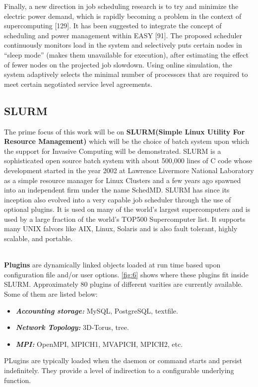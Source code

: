 Finally, a new direction in job scheduling research is to try and minimize the electric power demand, which is rapidly becoming a problem in the context of supercomputing [129]. It has been suggested to integrate the concept of scheduling and power management within EASY [91]. The proposed scheduler continuously monitors load in the system and selectively puts certain nodes in “sleep mode” (makes them unavailable for execution), after estimating the effect of fewer nodes on the projected job slowdown. Using online simulation, the system adaptively selects the minimal number of processors that are required to meet certain negotiated service level agreements.
\subsection{SLURM}
The prime focus of this work will be on \textbf{SLURM(Simple Linux Utility For Resource Management)} which will be the choice of batch system upon which the support for Invasive Computing will be demonstrated. SLURM is a sophisticated open source batch system with about 500,000 lines of C code whose development started in the year 2002 at Lawrence Livermore National Laboratory as a simple resource manager for Linux Clusters and a few years ago spawned into an independent firm under the name SchedMD. SLURM has since its inception also evolved into a very capable job scheduler through the use of optional plugins. It is used on many of the world's largest supercomputers and is used by a large fraction of the world's TOP500 Supercomputer list. It supports many UNIX falvors like AIX, Linux, Solaris and is also fault tolerant, highly scalable, and portable.\par
\noindent
\\
\textbf{Plugins} are dynamically linked objects loaded at run time based upon configuration file and/or user options. \ref{fig:6} shows where these plugins fit inside SLURM. Approximately $80$ plugins of different varities are currently available. Some of them are listed below:\\
\begin{itemize}
\item \textbf{\textit{Accounting storage:}} MySQL, PostgreSQL, textfile.
\item \textbf{\textit{Network Topology:}} 3D-Torus, tree.
\item \textbf{\textit{MPI:}} OpenMPI, MPICH1, MVAPICH, MPICH2, etc.
\end{itemize}
PLugins are typically loaded when the daemon or command starts and persist indefinitely. They provide a level of indirection to a configurable underlying function.
